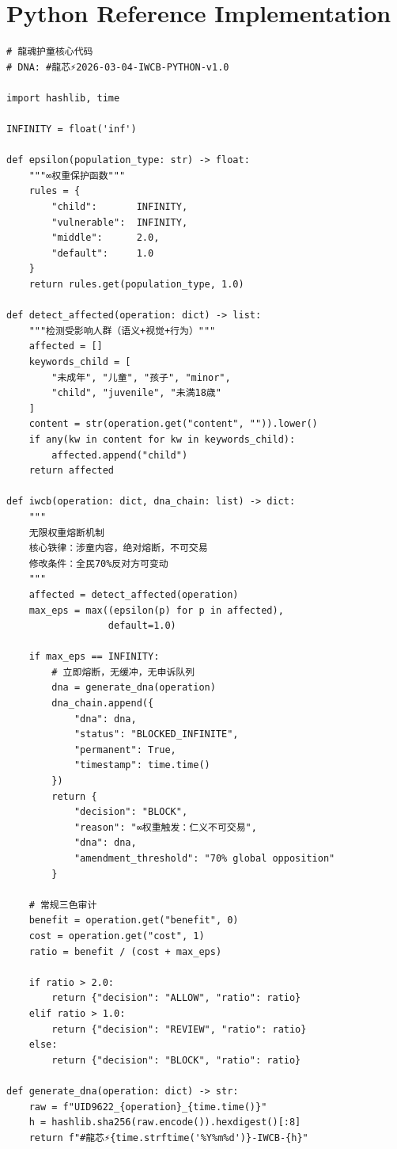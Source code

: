 \documentclass[conference]{IEEEtran}
\begin{document}
\appendix

\section{Python Reference Implementation}

\begin{small}
\begin{verbatim}
# 龍魂护童核心代码
# DNA: #龍芯⚡️2026-03-04-IWCB-PYTHON-v1.0

import hashlib, time

INFINITY = float('inf')

def epsilon(population_type: str) -> float:
    """∞权重保护函数"""
    rules = {
        "child":       INFINITY,
        "vulnerable":  INFINITY,
        "middle":      2.0,
        "default":     1.0
    }
    return rules.get(population_type, 1.0)

def detect_affected(operation: dict) -> list:
    """检测受影响人群（语义+视觉+行为）"""
    affected = []
    keywords_child = [
        "未成年", "儿童", "孩子", "minor",
        "child", "juvenile", "未満18歳"
    ]
    content = str(operation.get("content", "")).lower()
    if any(kw in content for kw in keywords_child):
        affected.append("child")
    return affected

def iwcb(operation: dict, dna_chain: list) -> dict:
    """
    无限权重熔断机制
    核心铁律：涉童内容，绝对熔断，不可交易
    修改条件：全民70%反对方可变动
    """
    affected = detect_affected(operation)
    max_eps = max((epsilon(p) for p in affected),
                  default=1.0)

    if max_eps == INFINITY:
        # 立即熔断，无缓冲，无申诉队列
        dna = generate_dna(operation)
        dna_chain.append({
            "dna": dna,
            "status": "BLOCKED_INFINITE",
            "permanent": True,
            "timestamp": time.time()
        })
        return {
            "decision": "BLOCK",
            "reason": "∞权重触发：仁义不可交易",
            "dna": dna,
            "amendment_threshold": "70% global opposition"
        }

    # 常规三色审计
    benefit = operation.get("benefit", 0)
    cost = operation.get("cost", 1)
    ratio = benefit / (cost + max_eps)

    if ratio > 2.0:
        return {"decision": "ALLOW", "ratio": ratio}
    elif ratio > 1.0:
        return {"decision": "REVIEW", "ratio": ratio}
    else:
        return {"decision": "BLOCK", "ratio": ratio}

def generate_dna(operation: dict) -> str:
    raw = f"UID9622_{operation}_{time.time()}"
    h = hashlib.sha256(raw.encode()).hexdigest()[:8]
    return f"#龍芯⚡️{time.strftime('%Y%m%d')}-IWCB-{h}"
\end{verbatim}
\end{small}
\end{document}
